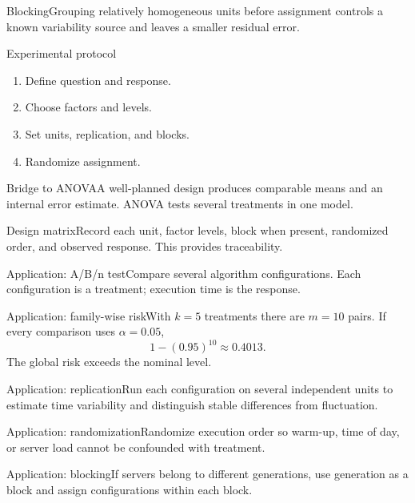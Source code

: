 \documentclass[10pt,aspectratio=169]{beamer}
\begin{document}
\begin{frame}{Blocking}\small Grouping relatively homogeneous units before assignment controls a known variability source and leaves a smaller residual error.\end{frame}
\begin{frame}{Experimental protocol}\small\begin{enumerate}\item Define question and response.\item Choose factors and levels.\item Set units, replication, and blocks.\item Randomize assignment.\end{enumerate}\end{frame}
\begin{frame}{Bridge to ANOVA}\small A well-planned design produces comparable means and an internal error estimate. ANOVA tests several treatments in one model.\end{frame}
\begin{frame}{Design matrix}\small Record each unit, factor levels, block when present, randomized order, and observed response. This provides traceability.\end{frame}
\begin{frame}{Application: A/B/n test}\small Compare several algorithm configurations. Each configuration is a treatment; execution time is the response.\end{frame}
\begin{frame}{Application: family-wise risk}\small With $k=5$ treatments there are $m=10$ pairs. If every comparison uses $\alpha=0.05$,\[1-(0.95)^{10}\approx0.4013.\]The global risk exceeds the nominal level.\end{frame}
\begin{frame}{Application: replication}\small Run each configuration on several independent units to estimate time variability and distinguish stable differences from fluctuation.\end{frame}
\begin{frame}{Application: randomization}\small Randomize execution order so warm-up, time of day, or server load cannot be confounded with treatment.\end{frame}
\begin{frame}{Application: blocking}\small If servers belong to different generations, use generation as a block and assign configurations within each block.\end{frame}
\end{document}
